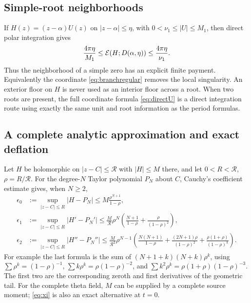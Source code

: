 \subsection{Simple-root neighborhoods}
If $H(z)=(z-\alpha)U(z)$ on $|z-\alpha|\le\eta$, with
$0<\nu_1\le|U|\le M_1$, then direct polar integration gives
\begin{equation}\label{eq:cap}
 \frac{4\pi\eta}{M_1}
 \le\mathcal E(H;D(\alpha,\eta))
 \le\frac{4\pi\eta}{\nu_1}.
\end{equation}
Thus the neighborhood of a simple zero has an explicit finite payment.
Equivalently the coordinate \eqref{eq:branchregular} removes the local
singularity. An exterior floor on $H$ is never used as an interior floor
across a root. When two roots are present, the full coordinate formula
\eqref{eq:directU} is a direct integration route using exactly the same
unit and root information as the period formulas.

\subsection{A complete analytic approximation and exact deflation}
Let $H$ be holomorphic on $|z-C|\le\mathcal R$ with $|H|\le M$ there,
and let $0<R<\mathcal R$, $\rho=R/\mathcal R$. For the degree-$N$
Taylor polynomial $P_N$ about $C$, Cauchy's coefficient estimate gives,
when $N\ge2$,
\begin{align}
 \epsilon_0&:=\sup_{|z-C|\le R}|H-P_N|
 \le M\frac{\rho^{N+1}}{1-\rho},\label{eq:tay0}\\
 \epsilon_1&:=\sup_{|z-C|\le R}|H'-P_N'|
 \le\frac M{\mathcal R}\rho^N
       \left(\frac{N+1}{1-\rho}+\frac\rho{(1-\rho)^2}\right),
 \label{eq:tay1}\\
 \epsilon_2&:=\sup_{|z-C|\le R}|H''-P_N''|
 \le\frac M{\mathcal R^2}\rho^{N-1}
 \left(\frac{N(N+1)}{1-\rho}
 +\frac{(2N+1)\rho}{(1-\rho)^2}
 +\frac{\rho(1+\rho)}{(1-\rho)^3}\right).
 \label{eq:tay2}
\end{align}
For example the last formula is the sum of
$(N+1+k)(N+k)\rho^k$, using
$\sum\rho^k=(1-\rho)^{-1}$,
$\sum k\rho^k=\rho(1-\rho)^{-2}$, and
$\sum k^2\rho^k=\rho(1+\rho)(1-\rho)^{-3}$.
The first two are the corresponding zeroth and first derivatives of the
geometric tail. For the complete theta field, $M$ can be supplied by a
complete source moment; \eqref{eq:xi} is also an exact alternative at
$t=0$.

